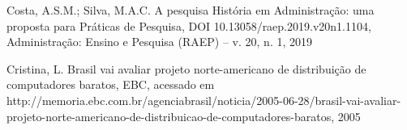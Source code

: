 \documentclass[
12pt,		%
openright,	%
twoside,  %
a4paper,			%
chapter=TITLE,		%
english,			%
french,				%
spanish,			%
brazil				%
]{USPSC-classe/USPSC}
\begin{document}
\begin{flushleft}
\begin{flushleft}
\begin{flushleft}
\begin{flushleft}
\begin{flushleft}
\begin{flushleft}
\begin{flushleft}
\begin{flushleft}
\begin{flushleft}
 Costa, A.S.M.; Silva, M.A.C. A pesquisa Hist\'oria em Administra\c{c}\~ao: uma proposta para Pr\'aticas de Pesquisa, DOI 10.13058/raep.2019.v20n1.1104, Administra\c{c}\~ao: Ensino e Pesquisa (RAEP) – v. 20, n. 1, 2019
\end{flushleft}


\end{flushleft}


\end{flushleft}


\end{flushleft}


\end{flushleft}


\end{flushleft}


\end{flushleft}


\end{flushleft}


\end{flushleft}


\begin{flushleft}
\begin{flushleft}
\begin{flushleft}
\begin{flushleft}
\begin{flushleft}
\begin{flushleft}
\begin{flushleft}
\begin{flushleft}
\begin{flushleft}
[CRISTINA, 2005] Cristina, L. Brasil vai avaliar projeto norte-americano de distribui\c{c}\~ao de computadores baratos, EBC, acessado em http://memoria.ebc.com.br/agenciabrasil/noticia/2005-06-28/brasil-vai-avaliar-projeto-norte-americano-de-distribuicao-de-computadores-baratos, 2005
\end{flushleft}


\end{flushleft}


\end{flushleft}


\end{flushleft}


\end{flushleft}


\end{flushleft}


\end{flushleft}


\end{flushleft}


\end{flushleft}
\end{document}

